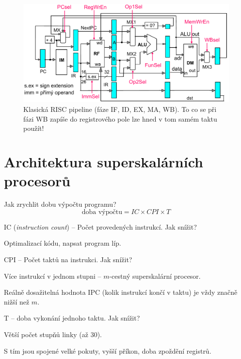 \begin{compactitem}
    \begin{figure}[H]
        \centering
        \includegraphics[width=1\linewidth]{risc_pipeline.pdf}
        \caption{Klasická RISC pipeline (fáze IF, ID, EX, MA, WB). To co se při fázi WB zapíše do registrového pole lze hned v tom samém taktu použít!}
    \end{figure}
\end{compactitem}


\section{Architektura superskalárních procesorů}

\begin{compactitem}
    \item Jak zrychlit dobu výpočtu programu?
    $$ \text{doba výpočtu} = IC \times CPI \times T $$
    \begin{compactitem}
        \item IC (\textit{instruction count}) -- Počet provedených instrukcí. Jak snížit? \begin{compactitem}
            \item Optimalizací kódu, napsat program líp.
        \end{compactitem}

        \item CPI -- Počet taktů na instrukci. Jak snížit? \begin{compactitem}
            \item Více instrukcí v jednom stupni -- $m$-cestný superskalární procesor.
            \item Reálně dosažitelná hodnota IPC (kolik instrukcí končí v taktu) je vždy značně nižší než $m$.
        \end{compactitem}

        \item T -- doba vykonání jednoho taktu. Jak snížit? \begin{compactitem}
            \item Větší počet stupňů linky (až 30).
            \item S tím jsou spojené velké pokuty, vyšší příkon, doba zpoždění registrů.
        \end{compactitem}
    \end{compactitem}
\end{compactitem}


